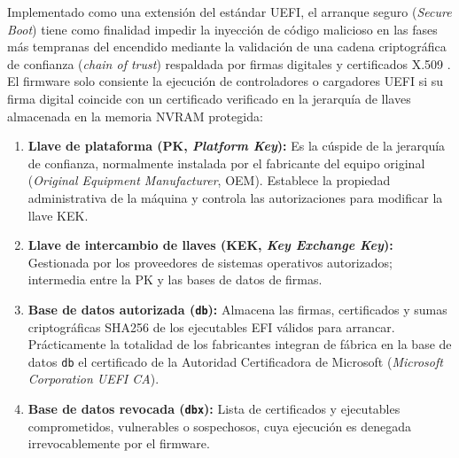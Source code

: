 \documentclass[12pt]{article}
\begin{document}
Implementado como una extensión del estándar UEFI, el arranque seguro (\textit{Secure Boot}) tiene como finalidad impedir la inyección de código malicioso en las fases más tempranas del encendido mediante la validación de una cadena criptográfica de confianza (\textit{chain of trust}) respaldada por firmas digitales y certificados X.509 \parencite{uefi2024specification}. El firmware solo consiente la ejecución de controladores o cargadores UEFI si su firma digital coincide con un certificado verificado en la jerarquía de llaves almacenada en la memoria NVRAM protegida:
\begin{enumerate}[noitemsep, topsep=2pt]
    \item \textbf{Llave de plataforma (PK, \textit{Platform Key}):} Es la cúspide de la jerarquía de confianza, normalmente instalada por el fabricante del equipo original (\textit{Original Equipment Manufacturer}, OEM). Establece la propiedad administrativa de la máquina y controla las autorizaciones para modificar la llave KEK.
    \item \textbf{Llave de intercambio de llaves (KEK, \textit{Key Exchange Key}):} Gestionada por los proveedores de sistemas operativos autorizados; intermedia entre la PK y las bases de datos de firmas.
    \item \textbf{Base de datos autorizada (\texttt{db}):} Almacena las firmas, certificados y sumas criptográficas SHA256 de los ejecutables EFI válidos para arrancar. Prácticamente la totalidad de los fabricantes integran de fábrica en la base de datos \texttt{db} el certificado de la Autoridad Certificadora de Microsoft (\textit{Microsoft Corporation UEFI CA}).
    \item \textbf{Base de datos revocada (\texttt{dbx}):} Lista de certificados y ejecutables comprometidos, vulnerables o sospechosos, cuya ejecución es denegada irrevocablemente por el firmware.
\end{enumerate}
\end{document}
